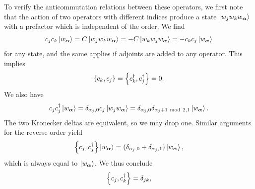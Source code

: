 To verify the anticommutation relations between these operators, we first note that the action of two operators with different indices produce a state $\ket{w_{j}w_{k}w_{\vb*{\alpha}}}$ with a prefactor which is independent of the order. We find
\begin{align*}
	c_{j}c_{k}\ket{w_{\vb*{\alpha}}} = C\ket{w_{j}w_{k}w_{\vb*{\alpha}}} = -C\ket{w_{k}w_{j}w_{\vb*{\alpha}}} = -c_{k}c_{j}\ket{w_{\vb*{\alpha}}}
\end{align*}
for any state, and the same applies if adjoints are added to any operator. This implies
\begin{align*}
	\acomm{c_{k}}{c_{j}} = \acomm{c_{k}\adj}{c_{j}\adj} = 0.
\end{align*}
We also have
\begin{align*}
	c_{j}c_{j}^{\dagger}\ket{w_{\vb*{\alpha}}} = \delta_{\alpha_{j}, 0}c_{j}\ket{w_{j}w_{\vb*{\alpha}}} = \delta_{\alpha_{j}, 0}\delta_{\alpha_{j} + 1\ \text{mod}\  2, 1}\ket{w_{\vb*{\alpha}}}.
\end{align*}
The two Kronecker deltas are equivalent, so we may drop one. Similar arguments for the reverse order yield
\begin{align*}
	\acomm{c_{j}}{c_{j}\adj}\ket{w_{\vb*{\alpha}}} = (\delta_{\alpha_{j}, 0} + \delta_{\alpha_{j}, 1})\ket{w_{\vb*{\alpha}}},
\end{align*}
which is always equal to $\ket{w_{\vb*{\alpha}}}$. We thus conclude
\begin{align*}
	\acomm{c_{j}}{c_{k}\adj} = \delta_{jk},
\end{align*}


